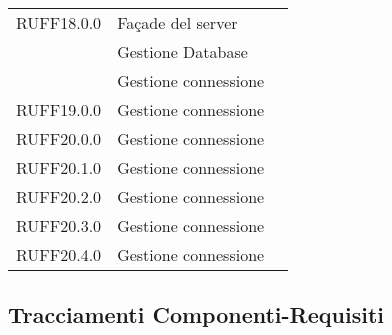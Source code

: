 \begin{center}
\begin{longtable}{lp{}l}
RUFF18.0.0 & Façade del server \\
 & Gestione Database \\
 & Gestione connessione \\
RUFF19.0.0 & Gestione connessione \\
RUFF20.0.0 & Gestione connessione \\
RUFF20.1.0 & Gestione connessione \\
RUFF20.2.0 & Gestione connessione \\
RUFF20.3.0 & Gestione connessione \\
RUFF20.4.0 & Gestione connessione \\
\bottomrule
\end{longtable}
\end{center}
\subsection{Tracciamenti Componenti-Requisiti}

